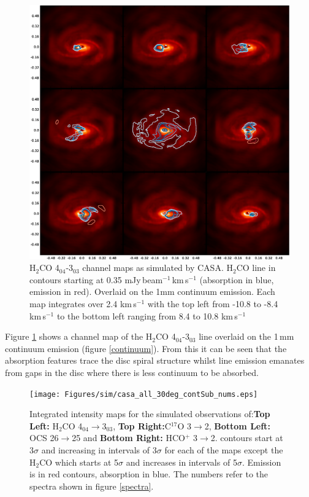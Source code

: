 \documentclass[useAMS,usenatbib]{mn2e}
\begin{document}
\begin{figure}
 \includegraphics[width=168mm]{Figures/sim/channel_map-1.eps} 
 \caption{H$_2$CO 4$_{04}$-3$_{03}$ channel maps as simulated by CASA. H$_2$CO line in contours starting at 0.35 mJy$\,$beam$^{-1}\,$km$\,$s$^{-1}$ (absorption in blue, emission in red). Overlaid on the 1mm continuum emission. Each map integrates over 2.4 km$\,$s$^{-1}$ with the top left from -10.8 to -8.4 km$\,$s$^{-1}$ to the bottom left ranging from 8.4 to 10.8 km$\,$s$^{-1}$}
 \label{h2co_chanmap}
\end{figure}

Figure \ref{h2co_chanmap} shows a channel map of the H$_2$CO 4$_{04}$-$3_{03}$ line overlaid on the 1$\,$mm continuum emission (figure \ref{continuum}). From this it can be seen that the absorption features trace the disc spiral structure whilst line emission emanates from gaps in the disc where there is less continuum to be absorbed.\newline


\begin{figure}
 \texttt{[image: Figures/sim/casa\_all\_30deg\_contSub\_nums.eps]}
 \caption{Integrated intensity maps for the simulated observations of:{\bf Top Left:} H$_2$CO 4$_{04}\rightarrow$3$_{03}$, {\bf Top Right:}C$^{17}$O 3$\rightarrow$2, {\bf Bottom Left:} OCS 26$\rightarrow$25 and {\bf Bottom Right:} HCO$^+$ 3$\rightarrow$2. contours start at 3$\sigma$ and increasing in intervals of 3$\sigma$ for each of the maps except the H$_2$CO which starts at 5$\sigma$ and increases in intervals of 5$\sigma$. Emission is in red contours, absorption in blue. The numbers refer to the spectra shown in figure \ref{spectra}.}
\label{mom0_maps}
\end{figure}
\end{document}
